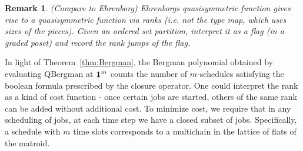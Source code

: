 \documentclass[12pt,reqno]{amsart}
\numberwithin{definition}{section}
\newtheorem{remark}[definition]{Remark}
\theoremstyle{definition}
\begin{document}
\begin{remark}
(Compare to Ehrenborg)
Ehrenborgs quasisymmetric function gives rise to a quasisymmetric function via ranks (i.e. not the type map, which uses sizes of the pieces).  Given an ordered set partition, interpret it as a flag (in a graded poset) and record the rank jumps of the flag.  





\end{remark}














In light of Theorem~\ref{thm:Bergman}, the Bergman polynomial obtained
by evaluating QBergman at ${\bf 1}^m$ counts the number of
$m$-schedules satisfying the boolean formula prescribed by the closure
operator.  One could interpret the rank as a kind of cost function -
once certain jobs are started, others of the same rank can be added
without additional cost.  To minimize cost, we require that in any
scheduling of jobs, at each time step we have a closed subset of jobs.
Specifically, a schedule with $m$ time slots corresponds to a
multichain in the lattice of flats of the matroid.  
\end{document}
